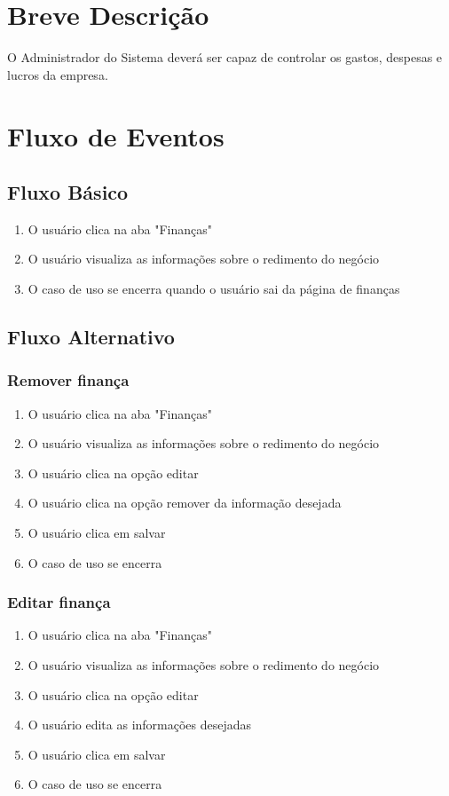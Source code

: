\section{Breve Descrição}

O Administrador do Sistema deverá ser capaz de controlar os gastos, despesas e lucros da empresa.

\section{Fluxo de Eventos}
\subsection{Fluxo Básico}

\begin{enumerate}
	\item O usuário clica na aba "Finanças"
	\item O usuário visualiza as informações sobre o redimento do negócio
	\item O caso de uso se encerra quando o usuário sai da página de finanças
\end{enumerate}

\subsection{Fluxo Alternativo}
\subsubsection{Remover finança}
\begin{enumerate}
	\item O usuário clica na aba "Finanças"
	\item O usuário visualiza as informações sobre o redimento do negócio
	\item O usuário clica na opção editar
	\item O usuário clica na opção remover da informação desejada
	\item O usuário clica em salvar
	\item O caso de uso se encerra
\end{enumerate}

\subsubsection{Editar finança}
\begin{enumerate}
	\item O usuário clica na aba "Finanças"
	\item O usuário visualiza as informações sobre o redimento do negócio
	\item O usuário clica na opção editar
	\item O usuário edita as informações desejadas
	\item O usuário clica em salvar
	\item O caso de uso se encerra
\end{enumerate}

